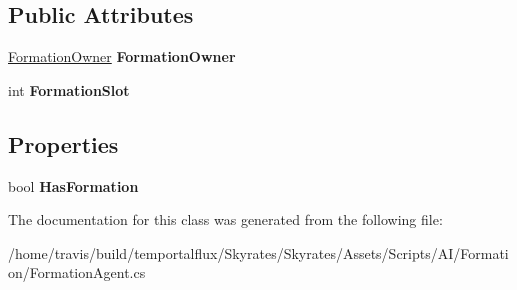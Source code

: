 \subsection*{Public Attributes}
\begin{DoxyCompactItemize}
\item 
\hypertarget{class_skyrates_1_1_a_i_1_1_formation_1_1_formation_agent_a741504b0a14f0cd5a0bdad7c2498e20f}{\hyperlink{class_skyrates_1_1_a_i_1_1_formation_1_1_formation_owner}{Formation\-Owner} {\bfseries Formation\-Owner}}\label{class_skyrates_1_1_a_i_1_1_formation_1_1_formation_agent_a741504b0a14f0cd5a0bdad7c2498e20f}

\item 
\hypertarget{class_skyrates_1_1_a_i_1_1_formation_1_1_formation_agent_a2a0aaed3656a64adf5c1baa3a6951f7c}{int {\bfseries Formation\-Slot}}\label{class_skyrates_1_1_a_i_1_1_formation_1_1_formation_agent_a2a0aaed3656a64adf5c1baa3a6951f7c}

\end{DoxyCompactItemize}
\subsection*{Properties}
\begin{DoxyCompactItemize}
\item 
\hypertarget{class_skyrates_1_1_a_i_1_1_formation_1_1_formation_agent_a40ccec6ca0fd8dfafa673d5d3de3efd1}{bool {\bfseries Has\-Formation}}\label{class_skyrates_1_1_a_i_1_1_formation_1_1_formation_agent_a40ccec6ca0fd8dfafa673d5d3de3efd1}

\end{DoxyCompactItemize}


The documentation for this class was generated from the following file\-:\begin{DoxyCompactItemize}
\item 
/home/travis/build/temportalflux/\-Skyrates/\-Skyrates/\-Assets/\-Scripts/\-A\-I/\-Formation/Formation\-Agent.\-cs\end{DoxyCompactItemize}
